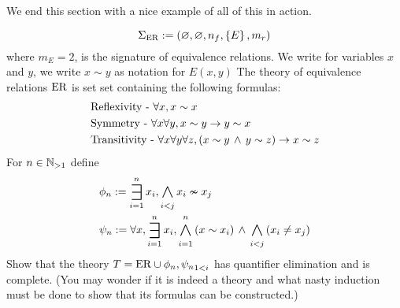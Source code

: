 We end this section with a nice example of all of this in action.
\begin{eg}
    \[\Sigma_{\mathrm{ER}} := (\varnothing,\varnothing,n_f,\left\{E\right\},m_r)\]
    where $m_E = 2$, is the signature of equivalence relations.
    We write for variables $x$ and $y$, 
    we write $x \sim y$ as notation for $E(x,y)$
    The theory of equivalence relations $\mathrm{ER}$ 
    is set set containing the following formulas:
    \begin{align*}
        &\text{Reflexivity - } \forall x, x \sim x\\
        &\text{Symmetry - } \forall x \forall y, x \sim y \to y \sim x\\
        &\text{Transitivity - } 
        \forall x \forall y \forall z, (x \sim y \, \land \, y \sim z) \to x \sim z
    \end{align*}
    For $n \in \mathbb{N}_{>1}$ define 
    \begin{align*}
        &\phi_n := \bigexists{i = 1}{n} x_i, \bigand{i < j}{} x_i \nsim x_j\\
        &\psi_n := \forall x, \bigexists{i = 1}{n} x_i, 
            \bigand{i = 1}{n} \brkt{x \sim x_i} \AND 
            \bigand{i < j}{} \brkt{x_i \ne x_j}
    \end{align*}
    Show that the theory $T = \mathrm{ER} \cup {\phi_n, \psi_n}_{1 < i}$ has 
    quantifier elimination and is complete.
    (You may wonder if it is indeed a theory
    and what nasty induction must be done to 
    show that its formulas can be constructed.)
\end{eg}

